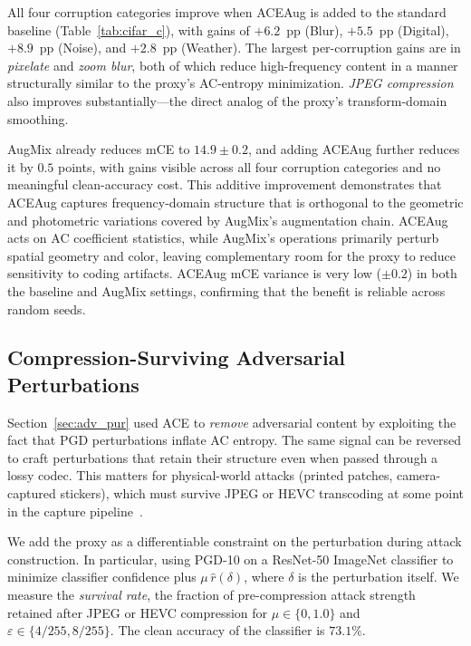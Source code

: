 All four corruption categories improve when ACEAug is added to the standard baseline (Table~\ref{tab:cifar_c}), with gains of $+6.2$~pp (Blur), $+5.5$~pp (Digital), $+8.9$~pp (Noise), and $+2.8$~pp (Weather).
The largest per-corruption gains are in \emph{pixelate} and \emph{zoom blur}, both of which reduce high-frequency content in a manner structurally similar to the proxy's AC-entropy minimization.
\emph{JPEG compression} also improves substantially---the direct analog of the proxy's transform-domain smoothing.

AugMix already reduces mCE to $14.9 \pm 0.2$, and adding ACEAug further reduces it by $0.5$ points, with gains visible across all four corruption categories and no meaningful clean-accuracy cost.
This additive improvement demonstrates that ACEAug captures frequency-domain structure that is orthogonal to the geometric and photometric variations covered by AugMix's augmentation chain.
ACEAug acts on AC coefficient statistics, while AugMix's operations primarily perturb spatial geometry and color, leaving complementary room for the proxy to reduce sensitivity to coding artifacts.
ACEAug mCE variance is very low ($\pm 0.2$) in both the baseline and AugMix settings, confirming that the benefit is reliable across random seeds.

\subsection{Compression-Surviving Adversarial Perturbations}
\label{sec:survival}

Section~\ref{sec:adv_pur} used ACE to \emph{remove} adversarial content by exploiting the fact that PGD perturbations inflate AC entropy.
The same signal can be reversed to craft perturbations that retain their structure even when passed through a lossy codec.
This matters for physical-world attacks (printed patches, camera-captured stickers), which must survive JPEG or HEVC transcoding at some point in the capture pipeline~\citep{shin2017jpeg}.

We add the proxy as a differentiable constraint on the perturbation during attack construction.
In particular, using PGD-10 on a ResNet-50 ImageNet classifier to minimize classifier confidence plus $\mu\,\hat{r}(\delta)$, where $\delta$ is the perturbation itself.
We measure the \emph{survival rate}, the fraction of pre-compression attack strength retained after JPEG or HEVC compression for $\mu\in\{0,1.0\}$ and $\varepsilon\in\{4/255,8/255\}$.
The clean accuracy of the classifier is $73.1\%$.

